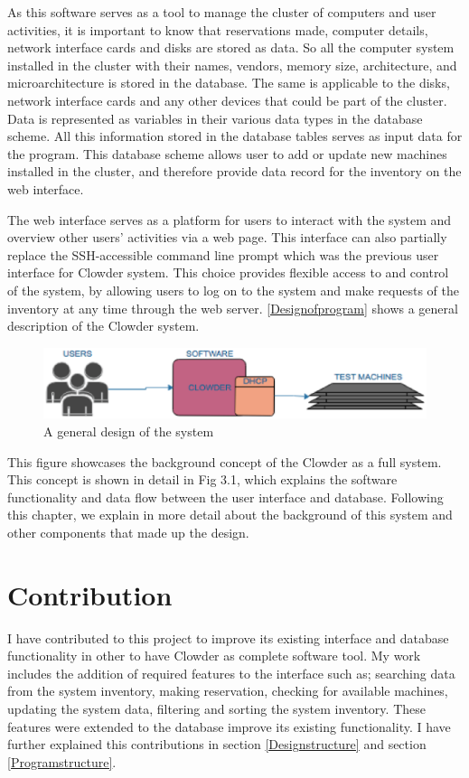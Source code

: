As this software serves as a tool to manage the cluster of computers and user activities, it is important to know that  reservations made, computer details, network interface cards and disks are stored as data. So all the computer system installed in the cluster with their names, vendors, memory size, architecture, and microarchitecture is stored in the database. The same is applicable to the disks, network interface cards and any other devices that could be part of the cluster. Data is represented as variables in their various data types in the database scheme.  All this information stored in the database tables serves as input  data for the program. This database scheme allows user to add or update new machines installed in the cluster, and therefore provide data record for the inventory on the web interface. 

The web interface serves as a platform for users to interact with the system and overview other users' activities via a web page. This interface can also  partially replace the SSH-accessible command line prompt which was the previous user interface for Clowder system. This choice provides flexible access to and control of the system, by allowing users to log on to the system and make requests of the inventory at any time through the web server.
\autoref{Designofprogram} shows a general description of the Clowder system.

\begin{figure}[h]
  \includegraphics[width=\linewidth]{background.eps}
  \caption{A general design of the system}
  \label{Designofprogram}
\end{figure}
\pagebreak

This figure showcases the background concept of the Clowder as a full system. This concept is shown in detail in Fig 3.1, which explains the software functionality and data flow between the user interface and database. Following this chapter, we explain in more detail about the background of this system and other components that made up the design.

\section{Contribution}
I have contributed to this project to improve its existing interface and database functionality in other to have Clowder as complete software tool. My work includes the addition of required features to the interface such as; searching data from the system inventory, making reservation, checking for available machines, updating the system data, filtering and sorting the system inventory. These features were extended to the database improve its existing functionality. I have further explained this contributions in section \ref{Designstructure} and section \ref{Programstructure}.
